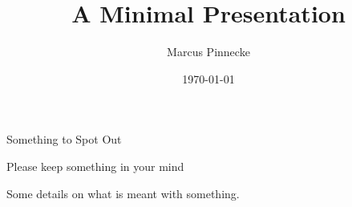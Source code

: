 \documentclass{beamer}
\title{A Minimal Presentation}
\date{\today}
\author{Marcus Pinnecke}
\institute{Metrocity Theme Headquarter}
\begin{document}
  \begin{frame}[t]{Something to Spot Out}
  \begin{spacing}{1.6}
    {\Large Please keep something in your mind}
    
    Some details on what is meant with something.
  \end{spacing}
  \end{frame}
\end{document}
